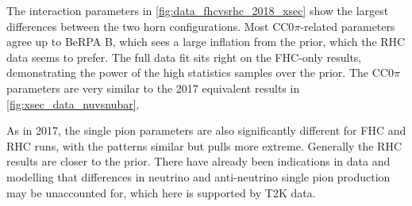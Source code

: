 The interaction parameters in \autoref{fig:data_fhcvsrhc_2018_xsec} show the largest differences between the two horn configurations. Most CC0$\pi$-related parameters agree up to BeRPA B, which sees a large inflation from the prior, which the RHC data seems to prefer. The full data fit sits right on the FHC-only results, demonstrating the power of the high statistics samples over the prior. The CC0$\pi$ parameters are very similar to the 2017 equivalent results in \autoref{fig:xsec_data_nuvsnubar}.

As in 2017, the single pion parameters are also significantly different for FHC and RHC runs, with the patterns similar but pulls more extreme. Generally the RHC results are closer to the prior. There have already been indications in data\cite{MIN_pion_2016} and modelling\cite{thesis_minoo} that differences in neutrino and anti-neutrino single pion production may be unaccounted for, which here is supported by T2K data.

